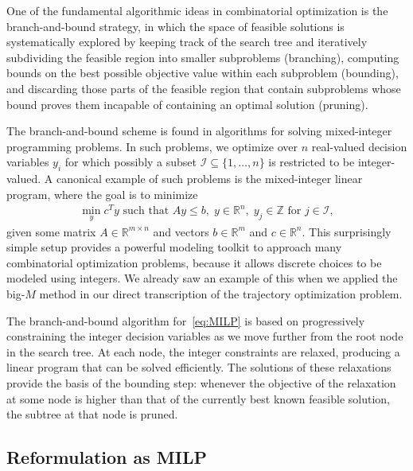 \documentclass{report}
\theoremstyle{definition}
\theoremstyle{plain}
\begin{document}

One of the fundamental algorithmic ideas in combinatorial optimization is the
branch-and-bound strategy, in which the space of feasible solutions is
systematically explored by keeping track of the search tree and iteratively
subdividing the feasible region into smaller subproblems (branching), computing
bounds on the best possible objective value within each subproblem (bounding),
and discarding those parts of the feasible region that contain subproblems whose
bound proves them incapable of containing an optimal solution (pruning).

The branch-and-bound scheme is found in algorithms for solving mixed-integer
programming problems.
%
In such problems, we optimize over $n$ real-valued decision variables $y_{i}$
for which possibly a subset $\mathcal{I} \subseteq \{1, \dots, n\}$ is
restricted to be integer-valued.
%
A canonical example of such problems is the mixed-integer linear program, where
the goal is to minimize
\begin{align}\label{eq:MILP}\tag{MILP}
  \min_{y} c^{T} y \text{ such that } Ay \leq b, \; y \in \mathbb{R}^{n}, \; y_{j} \in \mathbb{Z} \text{ for } j \in \mathcal{I},
\end{align}
given some matrix $A \in \mathbb{R}^{m\times n}$ and vectors
$b \in \mathbb{R}^{m}$ and $c \in \mathbb{R}^{n}$.
%
This surprisingly simple setup provides a powerful modeling toolkit to approach
many combinatorial optimization problems, because it allows discrete choices to
be modeled using integers.
%
We already saw an example of this when we applied the big-$M$ method in our
direct transcription of the trajectory optimization problem.

The branch-and-bound algorithm for~\eqref{eq:MILP} is based on progressively
constraining the integer decision variables as we move further from the root
node in the search tree.
%
At each node, the integer constraints are relaxed, producing a linear program
that can be solved efficiently.
%
The solutions of these relaxations provide the basis of the bounding step:
whenever the objective of the relaxation at some node is higher than that of the
currently best known feasible solution, the subtree at that node is pruned.

\subsection{Reformulation as MILP}
\end{document}
